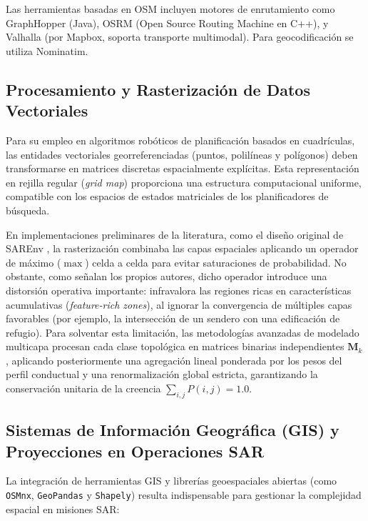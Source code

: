 Las herramientas basadas en OSM incluyen motores de enrutamiento como GraphHopper (Java), OSRM (Open Source Routing Machine en C++), y Valhalla (por Mapbox, soporta transporte multimodal). Para geocodificación se utiliza Nominatim.

\subsection{Procesamiento y Rasterización de Datos Vectoriales}

Para su empleo en algoritmos robóticos de planificación basados en cuadrículas, las entidades vectoriales georreferenciadas (puntos, polilíneas y polígonos) deben transformarse en matrices discretas espacialmente explícitas. Esta representación en rejilla regular (\textit{grid map}) proporciona una estructura computacional uniforme, compatible con los espacios de estados matriciales de los planificadores de búsqueda.

En implementaciones preliminares de la literatura, como el diseño original de SAREnv \cite{drones9090628}, la rasterización combinaba las capas espaciales aplicando un operador de máximo ($\max$) celda a celda para evitar saturaciones de probabilidad. No obstante, como señalan los propios autores, dicho operador introduce una distorsión operativa importante: infravalora las regiones ricas en características acumulativas (\textit{feature-rich zones}), al ignorar la convergencia de múltiples capas favorables (por ejemplo, la intersección de un sendero con una edificación de refugio). Para solventar esta limitación, las metodologías avanzadas de modelado multicapa procesan cada clase topológica en matrices binarias independientes $\mathbf{M}_k$, aplicando posteriormente una agregación lineal ponderada por los pesos del perfil conductual y una renormalización global estricta, garantizando la conservación unitaria de la creencia $\sum_{i,j} P(i,j) = 1.0$.

\subsection{Sistemas de Información Geográfica (GIS) y Proyecciones en Operaciones SAR}

La integración de herramientas GIS y librerías geoespaciales abiertas (como \texttt{OSMnx}, \texttt{GeoPandas} y \texttt{Shapely}) resulta indispensable para gestionar la complejidad espacial en misiones SAR:

